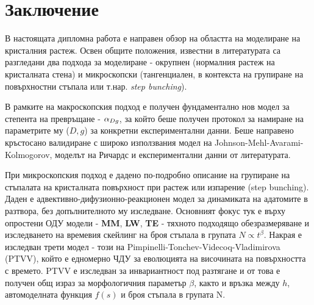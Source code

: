 \section{Заключение}
В настоящата дипломна работа е направен обзор на областта на моделиране на кристалния растеж. Освен общите положения, известни в литературата са разгледани два подхода за моделиране - окрупнен (нормалния растеж на кристалната стена) и микроскопски (тангенциален, в контекста на групиране на повърхностни стъпала или т.нар. \textit{step bunching}).

В рамките на макроскопския подход е получен фундаментално нов модел за степента на превръщане - $\alpha_{Dg}$, за който беше получен протокол за намиране на параметрите му ($D, g$) за конкретни експериментални данни. Беше направено кръстосано валидиране с широко използвания модел на Johnson-Mehl-Avarami-Kolmogorov, моделът на Ричардс и експериментални данни от литературата.

При микроскопския подход е дадено по-подробно описание на групиране на стъпалата на кристалната повърхност при растеж или изпарение (step bunching). Даден е адвективно-дифузионно-реакционен модел за динамиката на адатомите в разтвора, без допълнителното му изследване. Основният фокус тук е върху опростени ОДУ модели - \textbf{MM}, \textbf{LW}, \textbf{TE} - тяхното подходящо обезразмеряване и изследването на времевия скейлинг на броя стъпала в групата $N \propto t^\beta$. Накрая е изследван трети модел - този на Pimpinelli-Tonchev-Videcoq-Vladimirova (PTVV), който е едномерно ЧДУ за еволюцията на височината на повърхността с времето. PTVV е изследван за инвариантност под разтягане и от това е получен общ израз за морфологичния параметър $\beta$, както и връзка между $h$, автомоделната функция $f(s)$ и броя стъпала в групата N.
